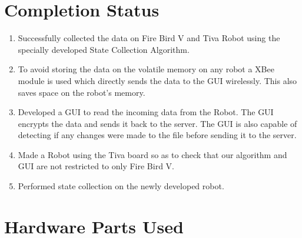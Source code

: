 \documentclass[a4paper,12pt,oneside]{book}
\begin{document}
\section{Completion Status}

\begin{enumerate}

    \item Successfully collected the data on Fire Bird V and Tiva Robot using the specially developed State Collection Algorithm.
    \item To avoid storing the data on the volatile memory on any robot a XBee module is used which directly sends the data to the GUI wirelessly. This also saves space on the robot's memory.
    \item Developed a GUI to read the incoming data from the Robot. The GUI encrypts the data and sends it back to the server. The GUI is also capable of detecting if any changes were made to the file before sending it to the server.
    \item Made a Robot using the Tiva board so as to check that our algorithm and GUI are not restricted to only Fire Bird V.
    \item Performed state collection on the newly developed robot.
\newpage

\end{enumerate}

\section{Hardware Parts Used}
\end{document}
